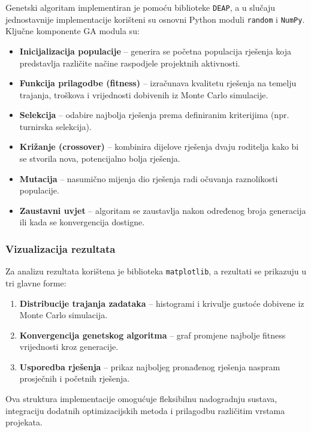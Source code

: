 Genetski algoritam implementiran je pomoću biblioteke \texttt{DEAP}, a u slučaju jednostavnije implementacije korišteni su osnovni Python moduli \texttt{random} i \texttt{NumPy}. Ključne komponente GA modula su:
\begin{itemize}
    \item \textbf{Inicijalizacija populacije} -- generira se početna populacija rješenja koja predstavlja različite načine raspodjele projektnih aktivnosti.
    \item \textbf{Funkcija prilagodbe (fitness)} -- izračunava kvalitetu rješenja na temelju trajanja, troškova i vrijednosti dobivenih iz Monte Carlo simulacije.
    \item \textbf{Selekcija} -- odabire najbolja rješenja prema definiranim kriterijima (npr. turnirska selekcija).
    \item \textbf{Križanje (crossover)} -- kombinira dijelove rješenja dvaju roditelja kako bi se stvorila nova, potencijalno bolja rješenja.
    \item \textbf{Mutacija} -- nasumično mijenja dio rješenja radi očuvanja raznolikosti populacije.
    \item \textbf{Zaustavni uvjet} -- algoritam se zaustavlja nakon određenog broja generacija ili kada se konvergencija dostigne.
\end{itemize}

\subsubsection{Vizualizacija rezultata}

Za analizu rezultata korištena je biblioteka \texttt{matplotlib}, a rezultati se prikazuju u tri glavne forme:
\begin{enumerate}
    \item \textbf{Distribucije trajanja zadataka} -- histogrami i krivulje gustoće dobivene iz Monte Carlo simulacija.
    \item \textbf{Konvergencija genetskog algoritma} -- graf promjene najbolje fitness vrijednosti kroz generacije.
    \item \textbf{Usporedba rješenja} -- prikaz najboljeg pronađenog rješenja naspram prosječnih i početnih rješenja.
\end{enumerate}

Ova struktura implementacije omogućuje fleksibilnu nadogradnju sustava, integraciju dodatnih optimizacijskih metoda i prilagodbu različitim vrstama projekata.
